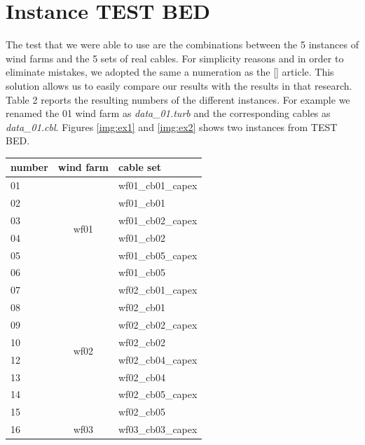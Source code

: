 \section{Instance TEST BED}
The test that we were able to use are the combinations between the 5 instances of wind farms and the 5 sets of real cables. For simplicity reasons and in order to eliminate mistakes, we adopted the same a numeration as the [\cite{wfcp}] article. This solution allows us to easily compare our results with the results in that research. 
Table 2 reports the resulting numbers of the different instances. For example we renamed the 01 wind farm as \textit{data\_01.turb} and the corresponding cables as \textit{data\_01.cbl}. Figures \ref{img:ex1} and \ref{img:ex2} shows two instances from TEST BED.

\begin{table}[!htbp]\label{tab:testBed}
\center
\begin{tabular}{lcl}
\hline
number & \multicolumn{1}{l}{wind farm} & cable set         \\ \hline
01     & \multirow{6}{*}{wf01}         & wf01\_cb01\_capex \\
02     &                               & wf01\_cb01        \\
03     &                               & wf01\_cb02\_capex \\
04     &                               & wf01\_cb02        \\
05     &                               & wf01\_cb05\_capex \\
06     &                               & wf01\_cb05        \\ \hline
07     & \multirow{8}{*}{wf02}         & wf02\_cb01\_capex \\
08     &                               & wf02\_cb01        \\
09     &                               & wf02\_cb02\_capex \\
10     &                               & wf02\_cb02        \\
12     &                               & wf02\_cb04\_capex \\
13     &                               & wf02\_cb04        \\
14     &                               & wf02\_cb05\_capex \\
15     &                               & wf02\_cb05        \\ \hline
16     & \multirow{4}{*}{wf03}         & wf03\_cb03\_capex \\

\end{tabular}
\end{table}
